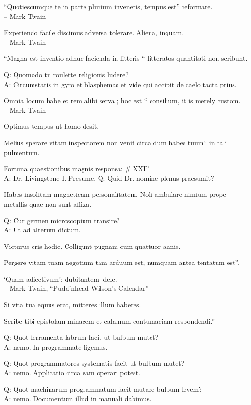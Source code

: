 \documentclass[titlepage,12pt]{memoir}
\begin{document}
“Quotiescumque te in parte plurium inveneris, tempus est”
reformare.
\\-- Mark Twain

Experiendo facile discimus adversa tolerare. Aliena, inquam.
\\-- Mark Twain

 “Magna est inventio adhuc facienda in litteris “
litteratos quantitati non scribunt.

Q: Quomodo tu roulette religionis ludere?\\
A: Circumstatis in gyro et blasphemas et vide qui accipit
de caelo tacta prius.

 Omnia locum habe et rem alibi serva ; hoc est “
consilium, it is merely custom.
\\-- Mark Twain

Optimus tempus ut homo desit.

Melius sperare vitam inspectorem non venit circa dum habes tuum”
in tali pulmentum.

Fortuna quaestionibus magnis responsa: \# XXI”\\
A: Dr. Livingstone I. Presume.
Q: Quid Dr. nomine plenus praesumit?

Habes insolitam magneticam personalitatem. Noli ambulare nimium prope
metallis quae non sunt affixa.

Q: Cur germen microscopium transire?\\
A: Ut ad alterum dictum.

Victurus eris hodie. Colligunt pugnam cum quattuor annis.

Pergere vitam tuam negotium tam arduum est, numquam antea tentatum est”.

‘Quam adiectivum’: dubitantem, dele.
\\-- Mark Twain, “Pudd’nhead Wilson’s Calendar”

Si vita tua equus erat, mitteres illum haberes.

Scribe tibi epistolam minacem et calamum contumaciam respondendi.”

Q: Quot ferramenta fabrum facit ut bulbum mutet?\\
A: nemo. In programmate figemus.

Q: Quot programmatores systematis facit ut bulbum mutet?\\
A: nemo. Applicatio circa eam operari potest.

Q: Quot machinarum programmatum facit mutare bulbum levem?\\
A: nemo. Documentum illud in manuali dabimus.
\end{document}
